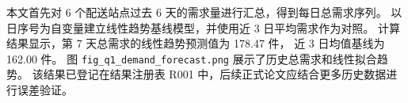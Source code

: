 本文首先对 6 个配送站点过去 6 天的需求量进行汇总，得到每日总需求序列。
以日序号为自变量建立线性趋势基线模型，并使用近 3 日平均需求作为对照。
	计算结果显示，第 7 天总需求的线性趋势预测值为 178.47 件，
	近 3 日均值基线为 162.00 件。
图 \texttt{fig\_q1\_demand\_forecast.png} 展示了历史总需求和线性拟合趋势。
该结果已登记在结果注册表 R001 中，后续正式论文应结合更多历史数据进行误差验证。

